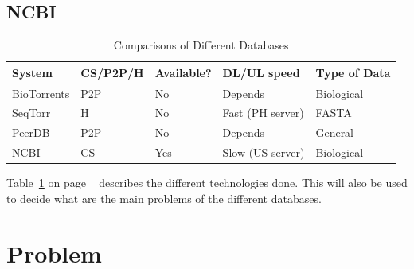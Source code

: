 \documentclass{article}
\begin{document}

\subsection{NCBI}





\begin{table}[h]
    \caption{Comparisons of Different Databases}
    \begin{tabular}{|l|l|l|l|l|}
    \hline
    System      & CS/P2P/H & Available? & DL/UL speed & Type of Data \\ \hline
    BioTorrents & P2P           & No         & Depends                    & Biological  \\ \hline
    SeqTorr     & H             & No         & Fast (PH server)           & FASTA        \\ \hline
    PeerDB      & P2P           & No         & Depends                    & General      \\ \hline
    NCBI        & CS            & Yes        & Slow (US server)           & Biological  \\ \hline
    \end{tabular}
    \label{table:database_comparison_table}
\end{table} 

Table~\ref{table:database_comparison_table} on page ~\pageref{table:database_comparison_table} describes the different technologies done. This will also be used to decide what are the main problems of the different databases.



\section{Problem}
\end{document}

